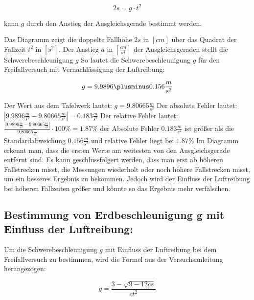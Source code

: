 \documentclass{protokoll}
\begin{document}
\begin{equation}
2s = g\cdot t^2
\end{equation}




kann $g$ durch den Anstieg der Ausgleichsgerade bestimmt werden.




Das Diagramm zeigt die doppelte Fallhöhe $2s$ in $[cm]$ über das Quadrat der Fallzeit $t^2$ in $[s^2]$.
Der Anstieg $a$ in $[\frac{cm}{s^2}]$ der Ausgleichsgeraden stellt die Schwerebeschleunigung $g$
So lautet die Schwerebeschleunigung $g$ für den Freifallversuch mit Vernachlässigung der Luftreibung:


\begin{equation}
 g = 9.9896 \plusminus 0.156 \frac{m}{s^2} 
\end{equation}

 


Der Wert aus dem Tafelwerk lautet: $g = 9.80665 \frac{m}{s^2}$
Der absolute Fehler lautet: $ |9.9896 \frac{m}{s^2} - 9.80665 \frac{m}{s^2}|  = 0.183 \frac{m}{s^2}$
Der relative Fehler lautet: $\frac{|9.9896 \frac{m}{s^2} - 9.80665 \frac{m}{s^2}|}{9.80665 \frac{m}{s^2}}\cdot 100 \% = 1.87 \%$
der Absolute Fehler $0.183 \frac{m}{s^2}$ ist größer als die Standardabweichung $ 0.156 \frac{m}{s^2} $ 
und relative Fehler liegt bei $1.87 \%$ Im Diagramm erkennt man, dass die ersten Werte am weitesten von den Ausgleichsgerade entfernt sind. 
Es kann geschlussfolgert werden, dass man erst ab höheren Fallstrecken misst, die Messungen wiederholt oder noch höhere Fallstrecken misst,
um ein besseres Ergebnis zu bekommen. Jedoch wird der Einfluss der Luftreibung bei höheren Fallzeiten größer und könnte so das Ergebnis mehr verfälschen.




\subsection{Bestimmung von Erdbeschleunigung g mit Einfluss der Luftreibung:}


Um die Schwerebeschleunigung $g$ mit Einfluss der Luftreibung bei dem Freifallversuch zu bestimmen,
wird die Formel aus der Versuchsanleitung herangezogen:


\begin{equation}
g = \frac{3 - \sqrt{9 - 12cs}}{ct^2}
\end{equation}
\end{document}

